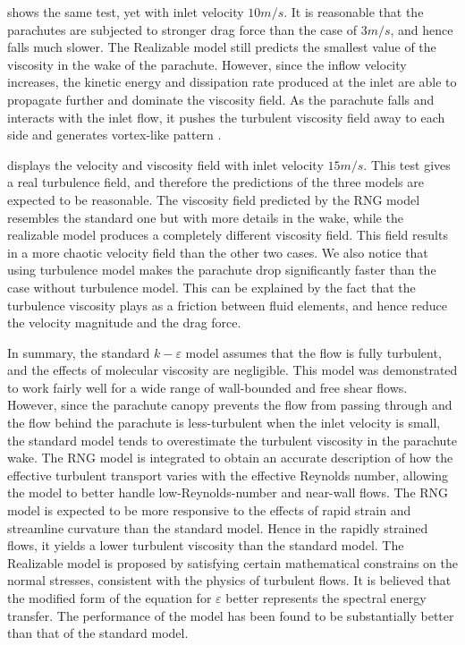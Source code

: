  shows the same test, yet with inlet velocity $10m/s$. It is reasonable that the parachutes are subjected to stronger drag force than the case of $3m/s$, and hence falls much slower. The Realizable model still predicts the smallest value of the viscosity in the wake of the parachute. However, since the inflow velocity increases, the kinetic energy and dissipation rate produced at the inlet are able to propagate further and dominate the viscosity field. As the parachute falls and interacts with the inlet flow, it pushes the turbulent viscosity field away to each side and generates vortex-like pattern \cite{Johari05}.

 displays the velocity and viscosity field with inlet velocity $15m/s$. This test gives a real turbulence field, and therefore the predictions of the three models are expected to be reasonable. The viscosity field predicted by the RNG model resembles the standard one but with more details in the wake, while the realizable model produces a completely different viscosity field. This field results in a more chaotic velocity field than the other two cases. We also notice that using turbulence model makes the parachute drop significantly faster than the case without turbulence model. This can be explained by the fact that the turbulence viscosity plays as a friction between fluid elements, and hence reduce the velocity magnitude and the drag force.

In summary, the standard $k-\varepsilon$ model assumes that the flow is fully turbulent, and the effects of molecular viscosity are negligible. This model was demonstrated to work fairly well for a wide range of wall-bounded and free shear flows. However, since the parachute canopy prevents the flow from passing through and the flow behind the parachute is less-turbulent when the inlet velocity is small, the standard model tends to overestimate the turbulent viscosity in the parachute wake. The RNG model is integrated to obtain an accurate description of how the effective turbulent transport varies with the effective Reynolds number, allowing the model to better handle low-Reynolds-number and near-wall flows. The RNG model is expected to be more responsive to the effects of rapid strain and streamline curvature than the standard model. Hence in the rapidly strained flows, it yields a lower turbulent viscosity than the standard model. The Realizable model is proposed by satisfying certain mathematical constrains on the normal stresses, consistent with the physics of turbulent flows. It is believed that the modified form of the equation for $\varepsilon$ better represents the spectral energy transfer. The performance of the model has been found to be substantially better than that of the standard model.

